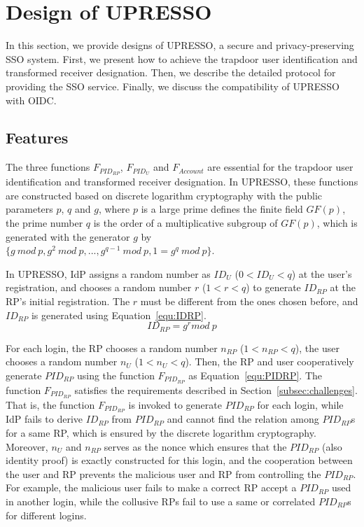 \section{Design of UPRESSO}
\label{sec:UPRESSO}
In this section, we provide designs of UPRESSO, a secure and privacy-preserving SSO system.
First, we present how to achieve the trapdoor user identification and transformed receiver designation. Then, we describe the detailed protocol for providing the SSO service. Finally, we discuss the compatibility of UPRESSO with OIDC.

\subsection{Features}
\label{subsec:overview}
The three functions $F_{PID_{RP}}$, $F_{PID_U}$ and $F_{Account}$  are essential for the trapdoor user identification and  transformed receiver designation.
In UPRESSO, these functions are constructed based on discrete logarithm cryptography with the public parameters $p$, $q$ and $g$,
 where  $p$ is a large prime defines the finite field $GF(p)$,  the prime number $q$  is the order of a multiplicative
subgroup of $GF(p)$, which is generated with the generator $g$ by $\{g\ mod\ p, g^2\ mod\ p, ..., g^{q-1}\ mod\ p, 1=g^q\ mod\ p\}$.

In UPRESSO, IdP assigns a  random number as  $ID_U$ ($0 < ID_U <q $)  at the user's registration, and chooses a random number $r$ ($1 < r < q$) to generate $ID_{RP}$ at the RP's initial registration. The $r$ must  be different from the ones chosen before, and $ID_{RP}$ is generated using Equation~\ref{equ:IDRP}.
   \begin{equation}
   ID_{RP} = g^{r} mod \ p
   \label{equ:IDRP}
   \end{equation}

For each login, the RP chooses a random number $n_{RP}$ ($1 < n_{RP}<q $), the user chooses a random number $n_{U}$ ($1 < n_{U}<q $). Then, the RP and user cooperatively  generate $PID_{RP}$ using the function $F_{PID_{RP}}$ as Equation~\ref{equ:PIDRP}. The function $F_{PID_{RP}}$ satisfies the requirements described in Section~\ref{subsec:challenges}. That is, the function $F_{PID_{RP}}$ is invoked to generate $PID_{RP}$ for each login, while IdP  fails to derive $ID_{RP}$ from $PID_{RP}$ and cannot find the relation among ${PID_{RP}}$s for a same RP, which is ensured by the discrete logarithm cryptography.
Moreover, $n_{U}$ and $n_{RP}$  serves as the nonce which ensures that the $PID_{RP}$ (also identity proof) is exactly constructed for this login, and
the cooperation between the user and RP prevents the malicious user and RP from controlling the  $PID_{RP}$. For example, the malicious user fails to make a correct RP accept a $PID_{RP}$ used in another login, while the collusive RPs fail to use a same or correlated $PID_{RP}$s for different logins.


